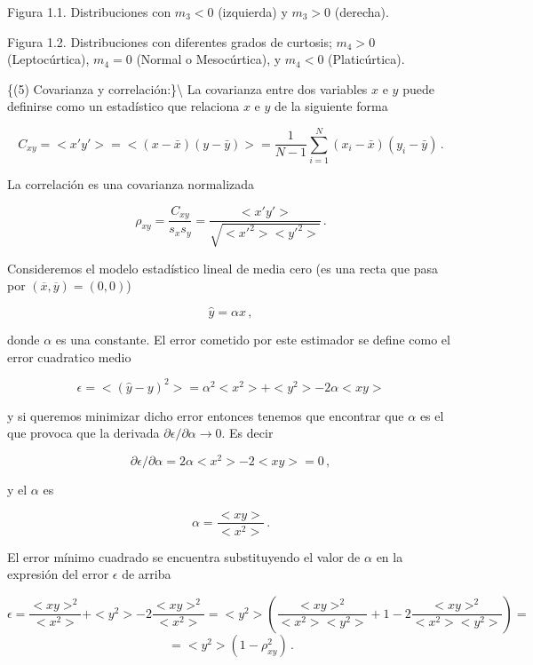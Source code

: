 \documentclass[
]{agujournal2019}
\begin{document}
\begin{center}
Figura 1.1. Distribuciones con $m_3<0$ (izquierda) y $m_3>0$ (derecha).
\end{center}

\begin{center}
\end{center}
\begin{center}
Figura 1.2. Distribuciones con diferentes grados de curtosis; $m_4>0$ (Leptocúrtica),
$m_4=0$ (Normal o Mesocúrtica), y $m_4<0$ (Platicúrtica).
\end{center}

\vspace{0.5cm}

\{\noindent  (5) Covarianza y correlación:\}\textbackslash{} La
covarianza entre dos variables \(x\) e \(y\) puede definirse como un
estadístico que relaciona \(x\) e \(y\) de la siguiente forma

\[C_{xy}=<x'y'>=<(x-\bar{x})(y-\bar{y})>=\frac{1}{N-1}\sum\limits^N_{i=1} (x_i-\bar{x})(y_i-\bar{y})\,.\]

La correlación es una covarianza normalizada

\[\rho_{x y}=\frac{C_{x y}}{s_x s_y}=\frac{<x' y'>}{\sqrt{<x'^2><y'^2>}}\,. \]

Consideremos el modelo estadístico lineal de media cero (es una recta
que pasa por \((\overline{x},\overline{y})=(0,0)\))

\[\hat{y}=\alpha x\,,\]

donde \(\alpha\) es una constante. El error cometido por este estimador
se define como el error cuadratico medio

\[\epsilon=<(\hat{y}-y)^2>=\alpha^2<x^2>+<y^2>-2\alpha<xy>\]

y si queremos minimizar dicho error entonces tenemos que encontrar que
\(\alpha\) es el que provoca que la derivada
\(\partial{\epsilon}/\partial{\alpha}\rightarrow{0}\). Es decir

\[\partial{\epsilon}/\partial{\alpha}=2\alpha<x^2>-2<xy>=0\,,\]

y el \(\alpha\) es

\[\alpha=\frac{<xy>}{<x^2>}\,.\]

El error mínimo cuadrado se encuentra substituyendo el valor de
\(\alpha\) en la expresión del error \(\epsilon\) de arriba

\[\epsilon=\frac{<xy>^2}{<x^2>} + <y^2> - 2\frac{<xy>^2}{<x^2>}=
           <y^2>\left(\frac{<xy>^2}{<x^2><y^2>}+1-2\frac{<xy>^2}{<x^2><y^2>}\right)=\]
\[=<y^2>(1-\rho^2_{xy})\,.\]
\end{document}
